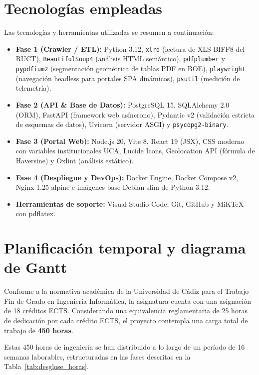 \section{Tecnologías empleadas}
Las tecnologías y herramientas utilizadas se resumen a continuación:
\begin{itemize}
    \item \textbf{Fase 1 (Crawler / ETL):} Python 3.12, \texttt{xlrd} (lectura de XLS BIFF8 del RUCT), \texttt{BeautifulSoup4} (análisis HTML semántico), \texttt{pdfplumber} y \texttt{pypdfium2} (segmentación geométrica de tablas PDF en BOE), \texttt{playwright} (navegación headless para portales SPA dinámicos), \texttt{psutil} (medición de telemetría).
    \item \textbf{Fase 2 (API \& Base de Datos):} PostgreSQL 15, SQLAlchemy 2.0 (ORM), FastAPI (framework web asíncrono), Pydantic v2 (validación estricta de esquemas de datos), Uvicorn (servidor ASGI) y \texttt{psycopg2-binary}.
    \item \textbf{Fase 3 (Portal Web):} Node.js 20, Vite 8, React 19 (JSX), CSS moderno con variables institucionales UCA, Lucide Icons, Geolocation API (fórmula de Haversine) y Oxlint (análisis estático).
    \item \textbf{Fase 4 (Despliegue y DevOps):} Docker Engine, Docker Compose v2, Nginx 1.25-alpine e imágenes base Debian slim de Python 3.12.
    \item \textbf{Herramientas de soporte:} Visual Studio Code, Git, GitHub y MiKTeX con pdflatex.
\end{itemize}

\section{Planificación temporal y diagrama de Gantt}
Conforme a la normativa académica de la Universidad de Cádiz para el Trabajo Fin de Grado en Ingeniería Informática, la asignatura cuenta con una asignación de 18 créditos ECTS. Considerando una equivalencia reglamentaria de 25 horas de dedicación por cada crédito ECTS, el proyecto contempla una carga total de trabajo de \textbf{450 horas}.

Estas 450 horas de ingeniería se han distribuido a lo largo de un período de 16 semanas laborables, estructuradas en las fases descritas en la Tabla~\ref{tab:desglose_horas}.

